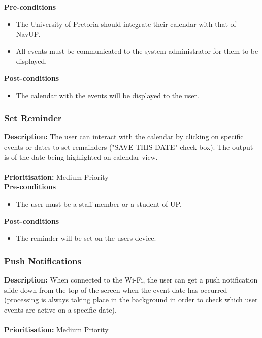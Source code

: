 \documentclass[runningheads,a4paper]{article}
\begin{document}
  
\textbf{Pre-conditions}
\begin{itemize}
	\item The University of Pretoria should integrate their calendar with that of NavUP.
	\item All events must be communicated to the system administrator for them to be displayed.
\end{itemize}
  
\textbf{Post-conditions}
\begin{itemize}
  	\item The calendar with the events will be displayed to the user.
\end{itemize}

\subsubsection{Set Reminder}

\textbf{Description:} The user can interact with the calendar by clicking on specific events or dates to set remainders ("SAVE THIS DATE" check-box). The output is of the date being highlighted on calendar view.\\\\
\noindent
\textbf{Prioritisation:} Medium Priority\\
  
  
\textbf{Pre-conditions}
\begin{itemize}
	\item The user must be a staff member or a student of UP.
\end{itemize}
  
\textbf{Post-conditions}
\begin{itemize}
  	\item The reminder will be set on the users device.
\end{itemize}

\subsubsection{Push Notifications}

\textbf{Description:} When connected to the Wi-Fi, the user can get a push notification slide down from the top of the screen when the event date has occurred (processing is always taking place in the background in order to check which user events are active on a specific date).\\\\
\noindent
\textbf{Prioritisation:} Medium Priority\\
  
\end{document}
